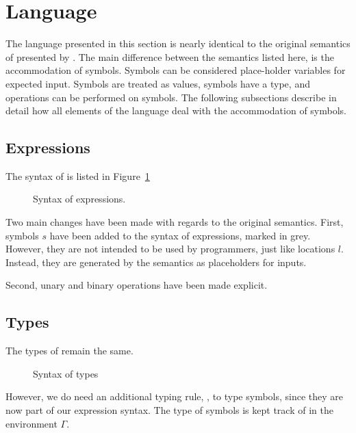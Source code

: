 

\section{Language}
\label{sec:language}

The language presented in this section is nearly identical to the original semantics of \TOPHAT presented by \citet{Steenvoorden2019}.
The main difference between the semantics listed here, is the accommodation of symbols.
Symbols can be considered place-holder variables for expected input.
Symbols are treated as values, symbols have a type, and operations can be performed on symbols.
The following subsections describe in detail how all elements of the \TOPHAT language deal with the accommodation of symbols.


\subsection{Expressions}
\label{expressions}

The syntax of \TOPHAT is listed in Figure~\ref{fig:syntaxtophat}

\begin{figure}
  \small
  \caption{Syntax of \TOPHAT expressions.}
  \label{fig:syntaxtophat}
\end{figure}

Two main changes have been made with regards to the original \TOPHAT semantics.
First, symbols $s$ have been added to the syntax of expressions, marked in grey.
However, they are not intended to be used by programmers, just like locations $l$.
Instead, they are generated by the semantics as placeholders for inputs.

Second, unary and binary operations have been made explicit.

\subsection{Types}

The types of \TOPHAT remain the same.

\begin{figure}
  \small
  \caption{Syntax of \TOPHAT types}
  \label{fig:syntaxtypes}
\end{figure}

However, we do need an additional typing rule, , to type symbols,
since they are now part of our expression syntax.
The type of symbols is kept track of in the environment $\Gamma$.

